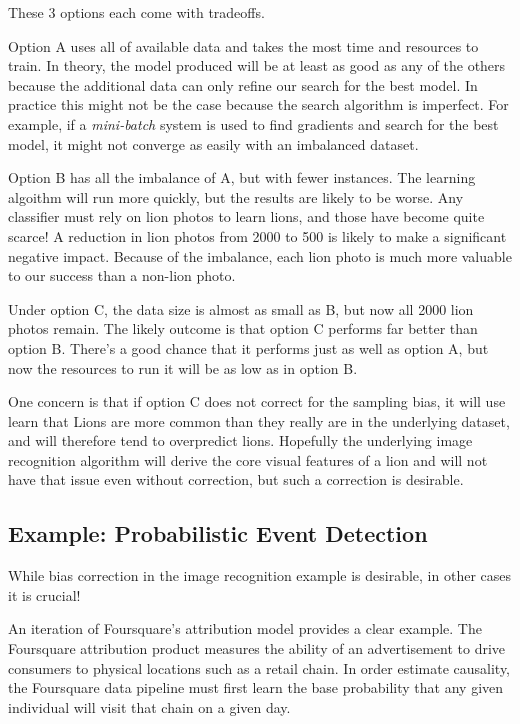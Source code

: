 \documentclass[twoside]{article}
\begin{document}
These 3 options each come with tradeoffs.

Option A uses all of available data and takes the most time and resources to train. In theory, the model produced will be at least as good as any of the others because the additional data can only refine our search for the best model. In practice this might not be the case because the search algorithm is imperfect. For example, if a \textit{mini-batch} system is used to find gradients and search for the best model, it might not converge as easily with an imbalanced dataset.

Option B has all the imbalance of A, but with fewer instances. The learning algoithm will run more quickly, but the results are likely to be worse. Any classifier must rely on lion photos to learn lions, and those have become quite scarce! A reduction in lion photos from 2000 to 500 is likely to make a significant negative impact. Because of the imbalance, each lion photo is much more valuable to our success than a non-lion photo. 

Under option C, the data size is almost as small as B, but now all 2000 lion photos remain. The likely outcome is that option C performs far better than option B. There's a good chance that it performs just as well as  option A, but now the resources to run it will be as low as in option B.

One concern is that if option C does not correct for the sampling bias, it will use learn that Lions are more common than they really are in the underlying dataset, and will therefore tend to overpredict lions. Hopefully the underlying image recognition algorithm will derive the core visual features of a lion and will not have that issue even without correction, but such a correction is desirable.

\subsection{Example: Probabilistic Event Detection}
\label{section:visit}

While bias correction in the image recognition example is desirable, in other cases it is crucial!

An iteration of Foursquare’s attribution model\cite{visitprediction} provides a clear example. The Foursquare attribution product measures the ability of an advertisement to drive consumers to physical locations such as a retail chain. In order estimate causality, the Foursquare data pipeline must first learn the base probability that any given individual will visit that chain on a given day.
\end{document}
